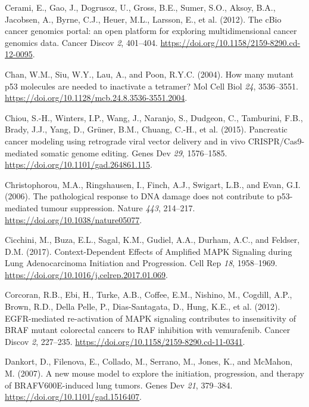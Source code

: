 \begin{CSLReferences}{0}{0}
\leavevmode{}%
Cerami, E., Gao, J., Dogrusoz, U., Gross, B.E., Sumer, S.O., Aksoy, B.A., Jacobsen, A., Byrne, C.J., Heuer, M.L., Larsson, E., et al. (2012). The cBio cancer genomics portal: an open platform for exploring multidimensional cancer genomics data. Cancer Discov \emph{2}, 401--404. \url{https://doi.org/10.1158/2159-8290.cd-12-0095}.

\leavevmode{}%
Chan, W.M., Siu, W.Y., Lau, A., and Poon, R.Y.C. (2004). How many mutant p53 molecules are needed to inactivate a tetramer? Mol Cell Biol \emph{24}, 3536--3551. \url{https://doi.org/10.1128/mcb.24.8.3536-3551.2004}.

\leavevmode{}%
Chiou, S.-H., Winters, I.P., Wang, J., Naranjo, S., Dudgeon, C., Tamburini, F.B., Brady, J.J., Yang, D., Grüner, B.M., Chuang, C.-H., et al. (2015). Pancreatic cancer modeling using retrograde viral vector delivery and in vivo CRISPR/Cas9-mediated somatic genome editing. Genes Dev \emph{29}, 1576--1585. \url{https://doi.org/10.1101/gad.264861.115}.

\leavevmode{}%
Christophorou, M.A., Ringshausen, I., Finch, A.J., Swigart, L.B., and Evan, G.I. (2006). The pathological response to DNA damage does not contribute to p53-mediated tumour suppression. Nature \emph{443}, 214--217. \url{https://doi.org/10.1038/nature05077}.

\leavevmode{}%
Cicchini, M., Buza, E.L., Sagal, K.M., Gudiel, A.A., Durham, A.C., and Feldser, D.M. (2017). Context-Dependent Effects of Amplified MAPK Signaling during Lung Adenocarcinoma Initiation and Progression. Cell Rep \emph{18}, 1958--1969. \url{https://doi.org/10.1016/j.celrep.2017.01.069}.

\leavevmode{}%
Corcoran, R.B., Ebi, H., Turke, A.B., Coffee, E.M., Nishino, M., Cogdill, A.P., Brown, R.D., Della Pelle, P., Dias-Santagata, D., Hung, K.E., et al. (2012). EGFR-mediated re-activation of MAPK signaling contributes to insensitivity of BRAF mutant colorectal cancers to RAF inhibition with vemurafenib. Cancer Discov \emph{2}, 227--235. \url{https://doi.org/10.1158/2159-8290.cd-11-0341}.

\leavevmode{}%
Dankort, D., Filenova, E., Collado, M., Serrano, M., Jones, K., and McMahon, M. (2007). A new mouse model to explore the initiation, progression, and therapy of BRAFV600E-induced lung tumors. Genes Dev \emph{21}, 379--384. \url{https://doi.org/10.1101/gad.1516407}.


\end{CSLReferences}
